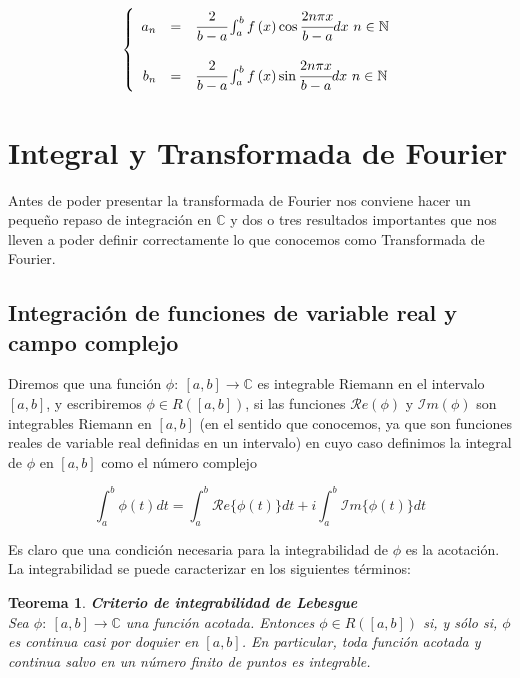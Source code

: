 \documentclass[a4paper,spanish]{article}
\def\Rea {\mathcal{R}e}
\def\Ima {\mathcal{I}m}
\def\N {\mathbb{N}}
\def\C {\mathbb{C}}
\newtheorem{teo}[prop]{Teorema}
\numberwithin{equation}{section}
\begin{document}
\begin{equation}
\left\lbrace \begin{array}{rcl} 
a_n & = & \cfrac{2}{b-a} \int_{a}^{b}{f \left({x}\right) \cos{\cfrac{2n \pi x}{b-a}}} dx \ n \in \N \\
& & \\
b_n & = & \cfrac{2}{b-a} \int_{a}^{b}{f \left({x}\right) \sin{\cfrac{2n \pi x}{b-a}}} dx \ n \in \N
\end{array} \right.
\end{equation}

\section{Integral y Transformada de Fourier}

Antes de poder presentar la transformada de Fourier nos conviene hacer un peque\~no repaso de integraci\'on en $\C$ y dos o tres resultados importantes que nos lleven a poder definir correctamente lo que conocemos como Transformada de Fourier.

\subsection{Integraci\'on de funciones de variable real y campo complejo}
Diremos que una funci\'on $\phi : \ [a,b] \rightarrow \C$ es integrable Riemann en el intervalo $[a,b]$, y
escribiremos $\phi \in R([a,b])$, si las funciones $\Rea(\phi)$ y $\Ima(\phi)$ son integrables Riemann en $[a,b]$ (en el sentido que conocemos, ya que son funciones reales de variable real definidas en
un intervalo) en cuyo caso definimos la integral de $\phi$ en $[a,b]$ como el n\'umero complejo

\[ \int_{a}^{b}{\phi(t)} dt = \int_{a}^{b}{\Rea \lbrace\phi(t)\rbrace} dt + i \int_{a}^{b}{\Ima \lbrace\phi(t)\rbrace} dt\]

Es claro que una condici\'on necesaria para la integrabilidad de $\phi$ es la acotaci\'on. La
integrabilidad se puede caracterizar en los siguientes t\'erminos:

\begin{teo}\textbf{Criterio de integrabilidad de Lebesgue}\\
Sea $\phi: \ [a,b] \rightarrow \C$ una funci\'on acotada. Entonces $\phi \in R ([a,b])$ si, y s\'olo si, $\phi$ es continua casi por doquier en $[a,b]$. En particular, toda funci\'on acotada y continua salvo en un n\'umero finito de puntos es integrable.
\end{teo}
\end{document}
